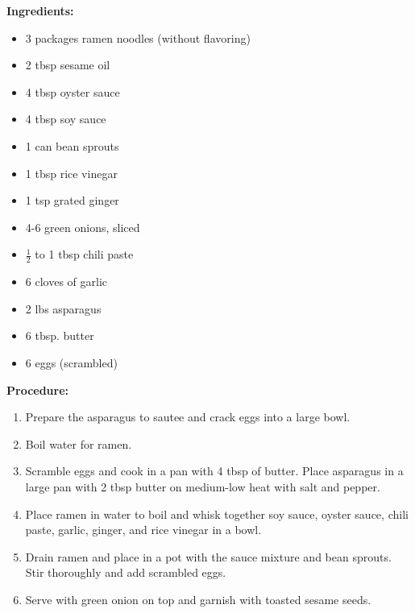 \begin{multicols}{2}
\textbf{Ingredients:}
\begin{itemize}
\item 3 packages ramen noodles (without flavoring)
\item 2 tbsp sesame oil 
\item 4 tbsp oyster sauce 
\item 4 tbsp soy sauce
\item 1 can bean sprouts
\item 1 tbsp rice vinegar 
\item 1 tsp grated ginger
\item 4-6 green onions, sliced
\item $\frac{1}{2}$ to 1 tbsp chili paste 
\item 6 cloves of garlic
\item 2 lbs asparagus 
\item 6 tbsp. butter 
\item 6 eggs (scrambled)




\end{itemize}


\columnbreak
\textbf{Procedure:}
\medskip


\begin{enumerate}

\item Prepare the asparagus to sautee and crack eggs into a large bowl.
\item Boil water for ramen. 
\item Scramble eggs and cook in a pan with 4 tbsp of butter. Place asparagus in a large pan with 2 tbsp butter on medium-low heat with salt and pepper. 
\item Place ramen in water to boil and whisk together soy sauce, oyster sauce, chili paste, garlic, ginger, and rice vinegar in a bowl. 
\item Drain ramen and place in a pot with the sauce mixture and bean sprouts. Stir thoroughly and add scrambled eggs. 
\item Serve with green onion on top and garnish with toasted sesame seeds. 
 
\end{enumerate}
\end{multicols}
